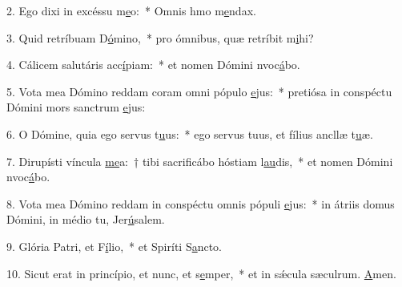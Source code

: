 2. Ego dixi in excéssu m\uline{e}o:~* Omnis hmo m\uline{e}ndax.\par 
3. Quid retríbuam D\uline{ó}mino,~* pro ómnibus, quæ retríbit m\uline{i}hi?\par 
4. Cálicem salutáris acc\uline{í}piam:~* et nomen Dómini nvoc\uline{á}bo.\par 
5. Vota mea Dómino reddam coram omni pópulo \uline{e}jus:~* pretiósa in conspéctu Dómini mors sanctrum \uline{e}jus:\par 
6. O Dómine, quia ego servus t\uline{u}us:~* ego servus tuus, et fílius ancllæ t\uline{u}æ.\par 
7. Dirupísti víncula \uline{me}a:~† tibi sacrificábo hóstiam l\uline{au}dis,~* et nomen Dómini nvoc\uline{á}bo.\par 
8. Vota mea Dómino reddam in conspéctu omnis pópuli \uline{e}jus:~* in átriis domus Dómini, in médio tu, Jer\uline{ú}salem.\par 
9. Glória Patri, et F\uline{í}lio,~* et Spiríti S\uline{a}ncto.\par 
10. Sicut erat in princípio, et nunc, et s\uline{e}mper,~* et in sǽcula sæculrum. \uline{A}men.\par 
